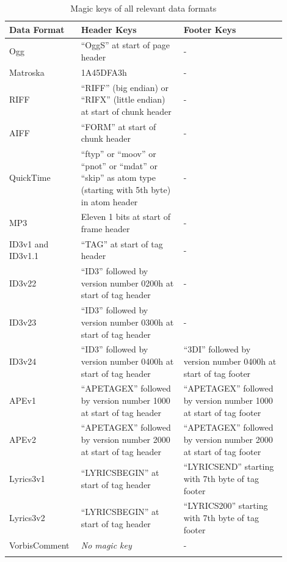 \begin{longtable}{|p{0.2\linewidth}|p{0.35\linewidth}|p{0.35\linewidth}|}
\hline
\rowcolor[gray]{.9}\textbf{Data Format} & \textbf{Header Keys} & \textbf{Footer Keys} \\
\endhead
\hline
Ogg  & ``OggS'' at start of page header & -  \\
\hline
Matroska  & 1A45DFA3h & -  \\
\hline
RIFF  & ``RIFF'' (big endian) or ``RIFX'' (little endian) at start of chunk header & -  \\
\hline
AIFF  & ``FORM'' at start of chunk header & -  \\
\hline
QuickTime  & ``ftyp'' or ``moov'' or ``pnot'' or ``mdat'' or ``skip'' as atom type (starting with 5th byte) in atom header & -  \\
\hline
MP3  & Eleven 1 bits at start of frame header & -  \\
\hline
ID3v1 and ID3v1.1  & ``TAG'' at start of tag header & -  \\
\hline
ID3v22  & ``ID3'' followed by version number 0200h at start of tag header & -  \\
\hline
ID3v23  & ``ID3'' followed by version number 0300h at start of tag header & -  \\
\hline
ID3v24  & ``ID3'' followed by version number 0400h at start of tag header & ``3DI'' followed by version number 0400h at start of tag footer \\
\hline
APEv1  & ``APETAGEX'' followed by version number 1000 at start of tag header & ``APETAGEX'' followed by version number 1000 at start of tag footer \\
\hline
APEv2  & ``APETAGEX'' followed by version number 2000 at start of tag header & ``APETAGEX'' followed by version number 2000 at start of tag footer \\
\hline
Lyrics3v1  & ``LYRICSBEGIN'' at start of tag header & ``LYRICSEND'' starting with 7th byte of tag footer  \\
\hline
Lyrics3v2  & ``LYRICSBEGIN'' at start of tag header & ``LYRICS200'' starting with 7th byte of tag footer  \\
\hline
VorbisComment  & \emph{No magic key} & -  \\
\hline
\caption{Magic keys of all relevant data formats}
\label{tab:magicKeys}
\end{longtable}


